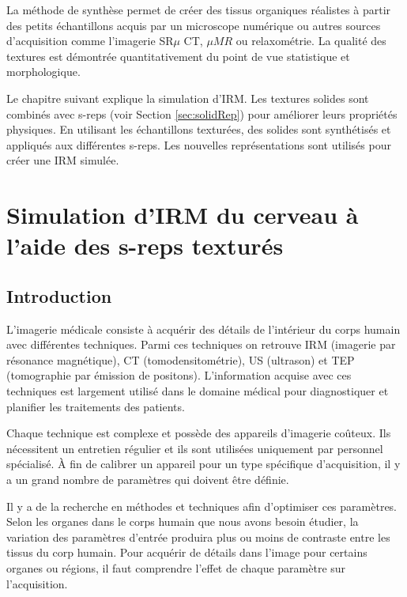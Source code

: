 La méthode de synthèse permet de créer des tissus organiques réalistes à partir des petits échantillons 
acquis par un microscope numérique ou autres sources d'acquisition comme l'imagerie SR$\mu$ CT, $\mu MR$ ou relaxométrie.
La qualité des textures est démontrée quantitativement du point de vue statistique et morphologique.

Le chapitre suivant explique la simulation d'IRM.
Les textures solides sont combinés
avec s-reps (voir Section \ref{sec:solidRep}) pour améliorer leurs propriétés physiques.
En utilisant les échantillons texturées, des solides sont synthétisés et appliqués aux différentes s-reps.
Les nouvelles représentations sont utilisés pour créer une IRM simulée.


\section{Simulation d'IRM du cerveau à l'aide des s-reps texturés}
\label{Chapter:MRISimulation}

\subsection{Introduction}

L'imagerie médicale consiste à acquérir des détails de l'intérieur du corps humain avec différentes techniques.
Parmi ces techniques on retrouve IRM (imagerie par résonance magnétique), CT (tomodensitométrie),
US (ultrason) et TEP (tomographie par émission de positons).
L'information acquise avec ces techniques est
largement utilisé dans le domaine médical pour diagnostiquer et planifier les traitements des patients.

Chaque technique est complexe et possède des appareils d'imagerie coûteux.
Ils nécessitent un entretien régulier et ils sont utilisées uniquement par personnel spécialisé.
À fin de calibrer un appareil pour un type spécifique d'acquisition, il y a un grand nombre de paramètres qui doivent être définie.

Il y a de la recherche en méthodes et techniques afin d'optimiser ces paramètres.
Selon les organes dans le corps humain que nous avons besoin étudier,
la variation des paramètres d'entrée produira plus ou moins de contraste entre les tissus du corp humain.
Pour acquérir de détails dans l'image pour certains organes ou régions, 
il faut comprendre l'effet de chaque paramètre sur l'acquisition.

